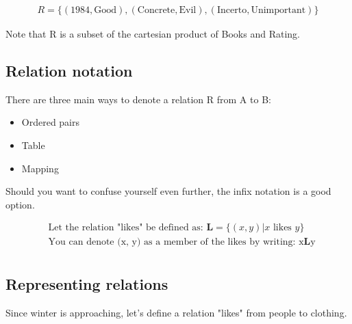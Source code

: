 \documentclass{article}
\begin{document}
\begin{align*}
    R = \{(1984, \text{Good}), (\text{Concrete}, \text{Evil}), (\text{Incerto}, \text{Unimportant})\}
\end{align*}

Note that R is a subset of the cartesian product of Books and Rating.

\subsection{Relation notation}

There are three main ways to denote a relation R from A to B:

\begin{itemize}
    \item Ordered pairs
    \item Table
    \item Mapping
\end{itemize}

Should you want to confuse yourself even further, the infix notation is a good option.

\begin{align*}
     & \text{Let the relation "likes" be defined as: } \mathbf{L} = \{(x, y) | x \text{ likes } y\} \\
     & \text{You can denote (x, y) as a member of the likes by writing: x$\mathbf{L}$y}             \\
\end{align*}

\subsection{Representing relations}

Since winter is approaching, let's define a relation "likes" from people to clothing.
\end{document}

